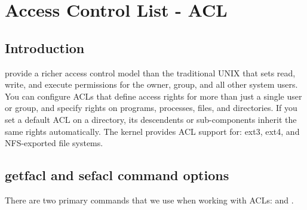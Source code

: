 \chapter{Access Control List - ACL}
\label{ch:acl}
\pagestyle{fancy}

\fancyhf{} %
\fancyhead[OC]{\leftmark} %
\setlength{\headheight}{13.99pt} 
\cfoot{\thepage} %
		

\section{Introduction}
 provide a richer access control model than the traditional UNIX  that sets read, write, and execute permissions for the owner, group, and all other system users. You can configure ACLs that define access rights for more than just a single user or group, and specify rights on programs, processes, files, and directories. If you set a default ACL on a directory, its descendents or sub-components inherit the same rights automatically. The kernel provides ACL support for: ext3, ext4, and NFS-exported file systems.\\

\section{getfacl and sefacl command options}
There are two primary commands that we use when working with ACLs:  and .

